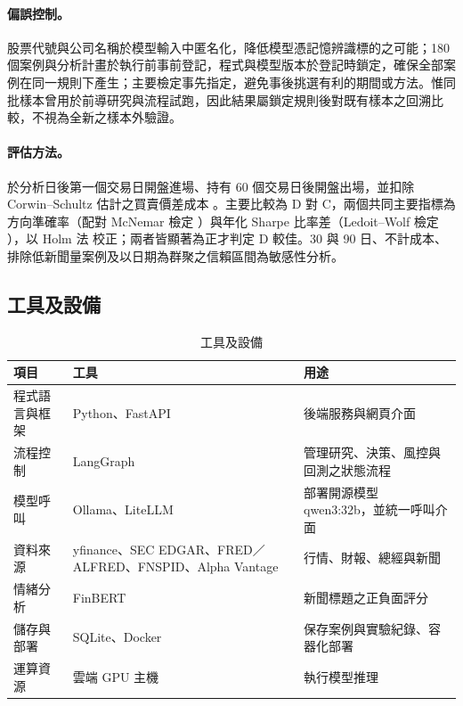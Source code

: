 \documentclass[12pt,a4paper]{article}
\newcommand{\grp}[1]{\textsf{#1}}
\begin{document}
\begin{CJK}{UTF8}{bkai}
\paragraph{偏誤控制。} 股票代號與公司名稱於模型輸入中匿名化，降低模型憑記憶辨識標的之可能；180 個案例與分析計畫於執行前事前登記，程式與模型版本於登記時鎖定，確保全部案例在同一規則下產生；主要檢定事先指定，避免事後挑選有利的期間或方法。惟同批樣本曾用於前導研究與流程試跑，因此結果屬鎖定規則後對既有樣本之回溯比較，不視為全新之樣本外驗證。

\paragraph{評估方法。} 於分析日後第一個交易日開盤進場、持有 60 個交易日後開盤出場，並扣除 Corwin--Schultz 估計之買賣價差成本 \citep{corwin2012spread}。主要比較為 \grp{D} 對 \grp{C}，兩個共同主要指標為方向準確率（配對 McNemar 檢定 \citep{mcnemar1947}）與年化 Sharpe 比率差（Ledoit--Wolf 檢定 \citep{ledoit2008sharpe}），以 Holm 法 \citep{holm1979} 校正；兩者皆顯著為正才判定 \grp{D} 較佳。30 與 90 日、不計成本、排除低新聞量案例及以日期為群聚之信賴區間為敏感性分析。

\subsection{工具及設備}

\begin{table}[H]
\centering\small
\caption{工具及設備}
\label{tab:tools}
\begin{tabularx}{\textwidth}{@{}l Y Y@{}}
\toprule
項目 & 工具 & 用途 \\
\midrule
程式語言與框架 & Python、FastAPI & 後端服務與網頁介面 \\
流程控制 & LangGraph & 管理研究、決策、風控與回測之狀態流程 \\
模型呼叫 & Ollama、LiteLLM & 部署開源模型 qwen3:32b，並統一呼叫介面 \\
資料來源 & yfinance、\allowbreak SEC EDGAR、\allowbreak FRED／ALFRED、\allowbreak FNSPID、\allowbreak Alpha Vantage &行情、財報、總經與新聞 \\
情緒分析 & FinBERT & 新聞標題之正負面評分 \\
儲存與部署 & SQLite、Docker & 保存案例與實驗紀錄、容器化部署 \\
運算資源 & 雲端 GPU 主機 & 執行模型推理 \\
\bottomrule
\end{tabularx}
\end{table}


\end{CJK}
\end{document}
